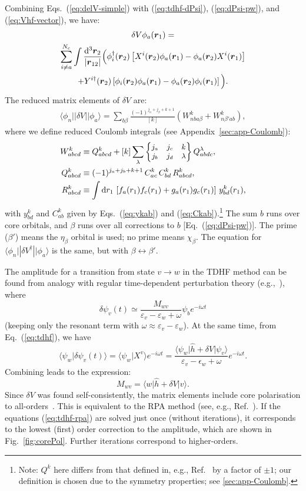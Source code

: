 \documentclass[10pt,twocolumn,a4paper]{article}%
\newcommand{\bra}[1]{\ensuremath{\langle #1|}}	%
\newcommand{\ket}[1]{\ensuremath{|#1\rangle}}	%
\newcommand{\braket}[1]{\ensuremath{\langle #1\rangle}}	%
\newcommand{\sixj}[6]{\small\ensuremath{\begin{Bmatrix}#1&#2&#3\\#4&#5&#6\end{Bmatrix}}}	%
\renewcommand{\v}[1]{\ensuremath{\boldsymbol{#1}}}		%
\newcommand{\be}{\begin{equation}}
\newcommand{\ee}{\end{equation}}
\def\d{\ensuremath{{\rm d}}}
\def\e{\ensuremath{\epsilon}}
\def\en{\ensuremath{\varepsilon}}
\renewcommand{\b}{\ensuremath{\beta}}
\newcommand{\w}{\ensuremath{\omega}}
\begin{document}
Combining Eqs.~(\ref{eq:delV-simple}) with (\ref{eq:tdhf-dPsi}), (\ref{eq:dPsi-pw}), and (\ref{eq:Vhf-vector}), we have:
\begin{multline}\label{eq:del-Vhf-vector}
\delta V\phi_a(\v{r}_1) = \\
\sum_{i\neq a}^{N_c}\int \frac{\d^3\v{r}_2}{|\v{r}_{12}|}
\Big(
\phi_i^\dag(\v{r}_2)\left[
X^i(\v{r}_2)\phi_a(\v{r}_1)
-\phi_a(\v{r}_2)  X^i(\v{r}_1)\right]\\
%
+Y^{i\dag}(\v{r}_2)\left[
\phi_i(\v{r}_2)  \phi_a(\v{r}_1)
-\phi_a(\v{r}_2) \phi_i(\v{r}_1)\right]
\Big).
\end{multline}
%
The reduced matrix elements of $\delta V$ are:
\begin{multline}\label{eq:dV-rme}
\bra{\phi_n}|\delta V|\ket{\phi_a}
 = 
 \sum_{b\beta}\frac{(-1)^{j_n+j_\beta+k+1}}{[k]} 
\left(
W^k_{nba\b} + W^k_{n\b'ab}\right),
\end{multline}
where we define reduced Coulomb integrals (see Appendix~\ref{sec:app-Coulomb}):
\begin{align}
\label{eq:Wk}
W^k_{abcd} & %
\equiv Q^k_{abcd} + [k] \sum_\lambda \sixj{j_a}{j_c}{k}{j_b}{j_d}{\lambda}Q^\lambda_{abdc} ,\\
\label{eq:Qk}
Q^k_{abcd} &\equiv (-1)^{j_a+j_b+k+1} \, C^k_{ac} \, C^k_{bd} \, R^k_{abcd},\\
\label{eq:Rk}
R^k_{abcd} &\equiv \int\d r_1 \, \left[f_a(r_1)f_c(r_1) + g_a(r_1)g_c(r_1)\right]\, y^k_{bd}(r_1),
\end{align}
with $y^k_{bd}$ and $C^k_{ab}$ given by Eqs.~(\ref{eq:ykab}) and (\ref{eq:Ckab}).\footnote{Note: $Q^k$ here differs from that defined in, e.g., Ref.~\cite{DzubaHFS1984} by a factor of $\pm1$; our definition is chosen due to the symmetry properties; see \ref{sec:app-Coulomb}.}
The sum $b$ runs over core orbitals, and $\beta$ runs over all corrections to $b$ [Eq.~(\ref{eq:dPsi-pw})].
The prime ($\beta'$) means the $\eta_\beta$ orbital is used; no prime means $\chi_\beta$.
The equation for $\bra{\phi_n}|\delta V^\dag|\ket{\phi_a}$ is the same, but with $\beta\leftrightarrow\beta'$.



The amplitude for a transition from state $v\to w$ in the TDHF method can be found from analogy with regular time-dependent perturbation theory (e.g.,~\cite{Sakurai2011}), where 
\[
\delta\psi_v(t) \simeq \frac{M_{wv}}{\en_v-\en_w+\w}\psi_be^{-i\w t}
\]
(keeping only the resonant term with $\w\approx\en_v-\en_w$).
At the same time, from Eq.~(\ref{eq:tdhf}), we have
\be
\braket{\psi_w | \delta\psi_v(t)} = \braket{\psi_w | X^v}e^{-i\w t}
= \frac{\bra{\psi_w} \hat h + \delta V \ket{\psi_v}}{\en_v - \e_w + \w}e^{-i\w t}.
\ee
Combining leads to the expression: 
\be
M_{wv} = \bra{w}\hat h + \delta V\ket{v}.
\ee
Since $\delta V$ was found self-consistently, the matrix elements include core polarisation  to all-orders~\cite{DzubaHFS1984,Dzuba1987jpbRPA}.
This is equivalent to the RPA method (see, e.g., Ref.~\cite{JohnsonBook2007}).
If the equations (\ref{eq:tdhf-rpa}) are solved just once (without iterations), it corresponds to the lowest (first) order correction to the amplitude, which are shown in Fig.~\ref{fig:corePol}.
Further iterations correspond to higher-orders.
\end{document}
